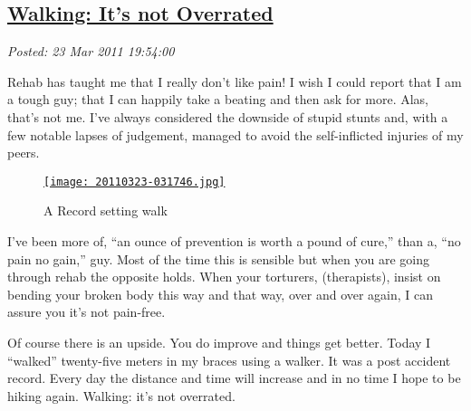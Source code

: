 %

\subsection*{\href{https://bakerjd99.wordpress.com/2011/03/23/walking-its-not-overrated/}{Walking: It's not Overrated}}


\noindent\emph{Posted: 23 Mar 2011 19:54:00}
\vspace{6pt}


Rehab has taught me that I really don't like pain! I wish I could report
that I am a tough guy; that I can happily take a beating and then ask
for more. Alas, that's not me. I've always considered the downside of
stupid stunts and, with a few notable lapses of judgement, managed to
avoid the self-inflicted injuries of my peers.

\captionsetup[figure]{labelformat=empty}
\begin{figure}
\centering
\href{http://conceptcontrol.smugmug.com/Themes/Diaries/SmugShots/16038397_XXJhZx#!i=1241678238&k=74gKFJm&lb=1&s=A}{\texttt{[image: 20110323-031746.jpg]}}
\caption{A Record setting walk}
\label{fig:1207X0}
\end{figure}

I've been more of, ``an ounce of prevention is worth a pound of cure,''
than a, ``no pain no gain,'' guy. Most of the time this is sensible but
when you are going through rehab the opposite holds. When your
torturers, (therapists), insist on bending your broken body this way and
that way, over and over again, I can assure you it's not pain-free.


Of course there is an upside. You do improve and things get better.
Today I ``walked'' twenty-five meters in my braces using a walker. It
was a post accident record. Every day the distance and time will
increase and in no time I hope to be hiking again. Walking: it's not
overrated.

